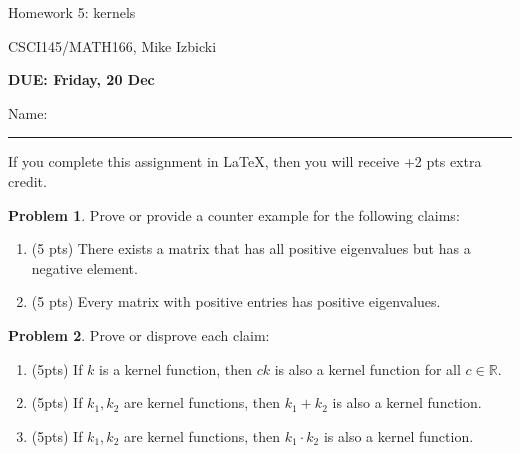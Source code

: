 \documentclass[10pt]{article}
\theoremstyle{definition}
\newtheorem{problem}{Problem}
\newcommand{\R}{\mathbb R}
\newcommand{\trans}[1]{{#1}^{T}}
\newcommand{\vv}{\mathbf v}
\newcommand{\x}{\mathbf x}
\begin{document}
\begin{center}
    {
\Large
Homework 5: kernels
}

    \vspace{0.1in}
CSCI145/MATH166, Mike Izbicki

    \vspace{0.1in}
    \textbf{DUE: Friday, 20 Dec}

    \vspace{0.1in}
\end{center}

\vspace{0.25in}
\noindent
Name:

\noindent
\rule{\textwidth}{0.1pt}
\vspace{0.25in}

\noindent
If you complete this assignment in \LaTeX, then you will receive +2 pts extra credit.

\vspace{0.25in}

\begin{problem}
    Prove or provide a counter example for the following claims:
    \begin{enumerate}
        \item
        (5 pts)
        There exists a matrix that has all positive eigenvalues but has a negative element.
            \vspace{3in}
        \item
        (5 pts)
        Every matrix with positive entries has positive eigenvalues.
            \vspace{3in}
    \end{enumerate}
\end{problem}


\begin{problem}
    Prove or disprove each claim:
    \begin{enumerate}
        \item (5pts) If $k$ is a kernel function, then $ck$ is also a kernel function for all $c\in\R$.
            \vspace{2.5in}
        \item (5pts) If $k_1,k_2$ are kernel functions, then $k_1 + k_2$ is also a kernel function.
            \vspace{2.5in}
        \item (5pts) If $k_1,k_2$ are kernel functions, then $k_1 \cdot k_2$ is also a kernel function.
    \end{enumerate}
\end{problem}
\newpage
\end{document}
